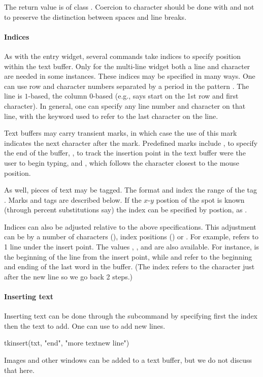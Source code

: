 The return value is of class .  Coercion to character
should be done with  and not
 to preserve the distinction between spaces and
line breaks.


\paragraph{Indices}
As with the entry widget, several commands take indices to specify
position within the text buffer. Only for the multi-line widget both a
line and character are needed in some instances. These indices may be
specified in many ways. One can use row and character numbers
separated by a period in the pattern . The line is
$1$-based, the column $0$-based (e.g.,  says start on the
1st row and first character). In general, one can specify any line
number and character on that line, with the keyword  used to
refer to the last character on the line. 

Text buffers may carry
transient marks, in which case the use of this mark indicates the next
character after the mark. Predefined marks include , to  specify the end of the
buffer, , to track the insertion point in the text
buffer were the user to begin typing, and , which 
follows the character closest to the mouse position. 

As well, pieces
of text may be tagged. The format  and 
index the range of the tag . Marks and tags are described
below. If the $x$-$y$ postion of the spot is known (through percent
substitutions say) the index can be specified by postion, as .

Indices can also be adjusted relative to the above
specifications. This adjustment can be by a number of characters
(), index positions () or . For
example,  refers to 1 line under the insert
point. The values , , 
and  are also available. For instance,  is the beginning of the line from the insert point, while
 and  refer to the
beginning and ending of the last word in the buffer. (The 
index refers to the character just after the new line so we go back 2
steps.)

\paragraph{Inserting text}
Inserting text can be done through the 
subcommand by specifying first the index then the text to add. One can
use  to add new lines.
\begin{Schunk}
\begin{Sinput}
 tkinsert(txt, "end", "more text\n new line")  
\end{Sinput}
\end{Schunk}
Images and other windows can be added to a text buffer, but we do not discuss that here.

